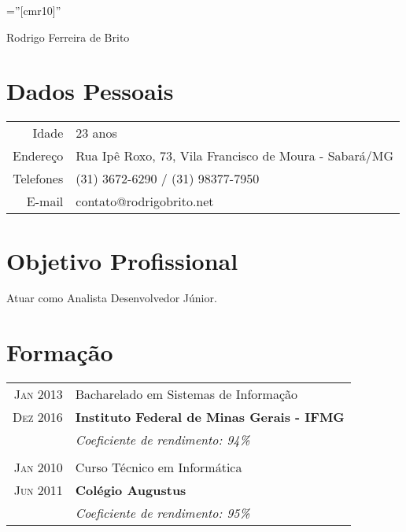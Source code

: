 \documentclass[a4paper,10pt]{article}
\begin{document}
\pagestyle{empty} %

\font\fb=''[cmr10]'' %

\vspace*{-1cm}
\par{\centering
	{\Huge Rodrigo Ferreira de Brito
}\bigskip\par}

\section{Dados Pessoais}

\begin{tabular}{rl}
Idade & 23 anos\\
Endereço & Rua Ipê Roxo, 73, Vila Francisco de Moura - Sabará/MG\\    
Telefones & (31) 3672-6290 / (31) 98377-7950\\
E-mail & contato@rodrigobrito.net\\
\end{tabular}

\section{Objetivo Profissional}

Atuar como Analista Desenvolvedor Júnior.

\section{Formação}
\begin{tabular}{r|p{13.1cm}}
	\textsc{Jan 2013} & Bacharelado em Sistemas de Informação\\
	\textsc{Dez 2016} & \textbf{Instituto Federal de Minas Gerais - IFMG}\\
	&\small\emph{Coeficiente de rendimento: 94\%}\\
	\multicolumn{2}{c}{} \\
	\textsc{Jan 2010}& Curso Técnico em Informática \\
	\textsc{Jun 2011}& \textbf{Colégio Augustus}\\
	&\small\emph{Coeficiente de rendimento: 95\%}\\
\end{tabular}
\end{document}
